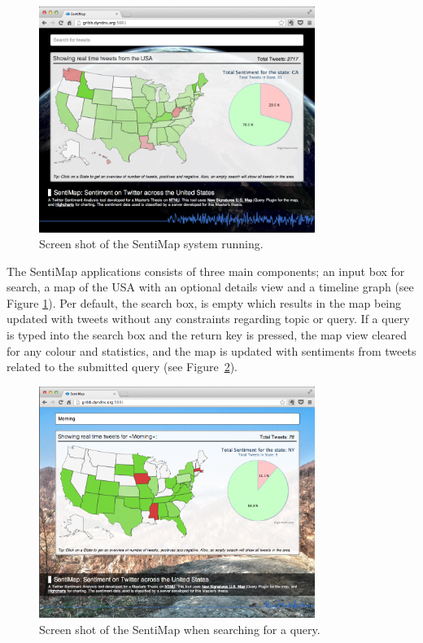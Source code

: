 \begin{figure}[htb!]
\begin{center}
 \includegraphics[width=0.8\textwidth]{../img/sentimap_screenshot.png}
 \caption{Screen shot of the SentiMap system running.}
 \label{fig:sentimap_screenshot}
\end{center}
\end{figure}

The SentiMap applications consists of three main components; an input box for search, a map of the USA with an optional details view and a timeline graph (see Figure \ref{fig:sentimap_screenshot}). Per default, the search box, is empty which results in the map being updated with tweets without any constraints regarding topic or query. If a query is typed into the search box and the return key is pressed, the map view cleared for any colour and statistics, and the map is updated with sentiments from tweets related to the submitted query (see Figure~\ref{fig:sentimap_screenshot_search}). 

\begin{figure}[htb!]
\begin{center}
 \includegraphics[width=0.8\textwidth]{../img/sentimap_screenshot_search.png}
 \caption{Screen shot of the SentiMap when searching for a query.}
 \label{fig:sentimap_screenshot_search}
\end{center}
\end{figure}

